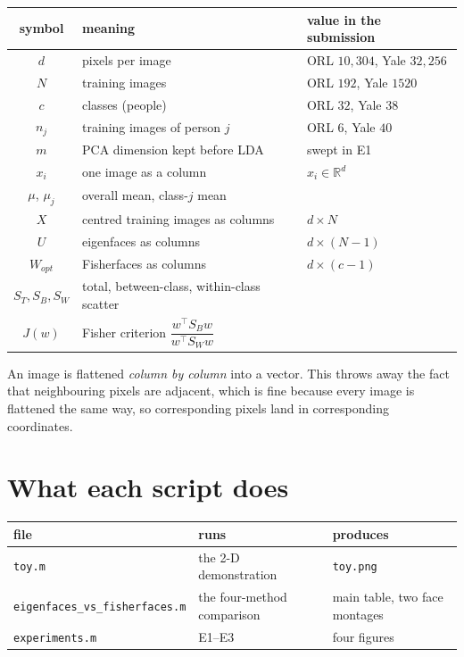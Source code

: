 \documentclass[11pt]{article}
\newcommand{\T}{^{\top}}
\begin{document}
\begin{center}
\begin{tabular}{cll}\toprule
symbol & meaning & value in the submission\\\midrule
$d$ & pixels per image & ORL $10{,}304$, Yale $32{,}256$\\
$N$ & training images & ORL $192$, Yale $1520$\\
$c$ & classes (people) & ORL $32$, Yale $38$\\
$n_j$ & training images of person $j$ & ORL $6$, Yale $40$\\
$m$ & PCA dimension kept before LDA & swept in E1\\
$x_i$ & one image as a column & $x_i\in\mathbb R^{d}$\\
$\mu$, $\mu_j$ & overall mean, class-$j$ mean & \\
$X$ & centred training images as columns & $d\times N$\\
$U$ & eigenfaces as columns & $d\times(N-1)$\\
$W_{opt}$ & Fisherfaces as columns & $d\times(c-1)$\\
$S_T,S_B,S_W$ & total, between-class, within-class scatter & \\
$J(w)$ & Fisher criterion $\dfrac{w\T S_Bw}{w\T S_Ww}$ & \\\bottomrule
\end{tabular}
\end{center}

An image is flattened \emph{column by column} into a vector. This throws away
the fact that neighbouring pixels are adjacent, which is fine because every
image is flattened the same way, so corresponding pixels land in corresponding
coordinates.

\section{What each script does}

\begin{center}
\small
\begin{tabular}{@{}p{5.1cm}p{4.0cm}p{5.2cm}@{}}\toprule
file & runs & produces\\\midrule
\texttt{toy.m} & the 2-D demonstration & \texttt{toy.png}\\
\texttt{eigenfaces\_vs\_fisherfaces.m} & the four-method comparison & main table, two face montages\\
\texttt{experiments.m} & E1--E3 & four figures\\\bottomrule
\end{tabular}
\end{center}
\end{document}
